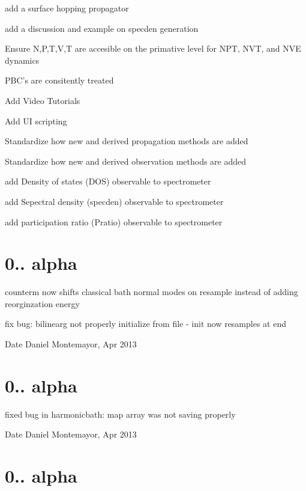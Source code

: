 \begin{DoxyItemize}
\item add a surface hopping propagator
\item add a discussion and example on specden generation
\item Ensure N,P,T,V,T are accesible on the primative level for N\+P\+T, N\+V\+T, and N\+V\+E dynamics
\item P\+B\+C's are consitently treated
\item Add Video Tutorials
\item Add U\+I scripting
\item Standardize how new and derived propagation methods are added
\item Standardize how new and derived observation methods are added
\item add Density of states (D\+O\+S) observable to spectrometer
\item add Sepectral density (specden) observable to spectrometer
\item add participation ratio (Pratio) observable to spectrometer
\end{DoxyItemize}\hypertarget{_tags_v0_1_44a}{}\section{0.. alpha}\label{_tags_v0_1_44a}

\begin{DoxyItemize}
\item counterm now shifts classical bath normal modes on resample instead of adding reorginzation energy
\item fix bug\+: bilinearg not properly initialize from file -\/ init now resamples at end \begin{DoxyDate}{Date}
Daniel Montemayor, Apr 2013
\end{DoxyDate}

\end{DoxyItemize}\hypertarget{_tags_v0_1_43a}{}\section{0.. alpha}\label{_tags_v0_1_43a}

\begin{DoxyItemize}
\item fixed bug in harmonicbath\+: map array was not saving properly \begin{DoxyDate}{Date}
Daniel Montemayor, Apr 2013
\end{DoxyDate}

\end{DoxyItemize}\hypertarget{_tags_v0_1_42a}{}\section{0.. alpha}\label{_tags_v0_1_42a}


